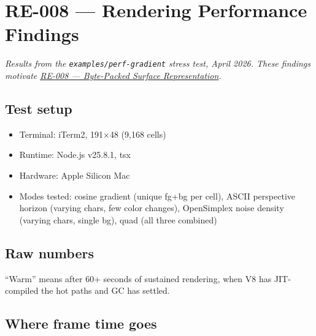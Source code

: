 \chapter{RE-008 --- Rendering Performance Findings}\label{record-156}

\smallskip

\emph{Results from the \texttt{e\allowbreak{}x\allowbreak{}a\allowbreak{}m\allowbreak{}p\allowbreak{}l\allowbreak{}e\allowbreak{}s\allowbreak{}/\allowbreak{}p\allowbreak{}e\allowbreak{}r\allowbreak{}f\allowbreak{}-\allowbreak{}g\allowbreak{}r\allowbreak{}a\allowbreak{}d\allowbreak{}i\allowbreak{}e\allowbreak{}n\allowbreak{}t} stress test, April 2026. These findings motivate \href{https://github.com/flyingrobots/bijou/blob/cbd70612140e7a450d764b3c7be1c6af878b99bc/docs/method/graveyard/legacy-backlog/asap/RE-008-byte-packed-surface-representation.md}{RE-008 --- Byte-Packed Surface Representation}.}

\section{Test setup}\label{record-156-test-setup}

\begin{itemize}
\tightlist
\item
  Terminal: iTerm2, 191×48 (9,168 cells)
\item
  Runtime: Node.js v25.8.1, tsx
\item
  Hardware: Apple Silicon Mac
\item
  Modes tested: cosine gradient (unique fg+bg per cell), ASCII perspective horizon (varying chars, few color changes), OpenSimplex noise density (varying chars, single bg), quad (all three combined)
\end{itemize}

\section{Raw numbers}\label{record-156-raw-numbers}



``Warm'' means after 60+ seconds of sustained rendering, when V8 has JIT-compiled the hot paths and GC has settled.

\section{Where frame time goes}\label{record-156-where-frame-time-goes}


